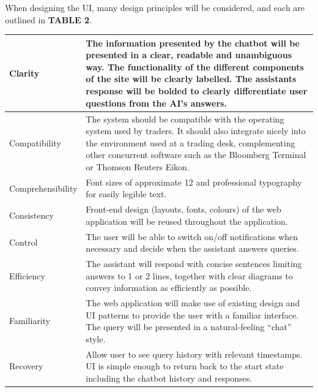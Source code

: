 \documentclass[]{IEEEtran}
\begin{document}
When designing the UI, many design principles will be considered, and each are outlined in \textbf{TABLE 2}.
	\begin{table}[h]
	\begin{tabular}{| m{2cm} | m{5.5cm} | }
		\hline
		Clarity & The information presented by the chatbot will be presented in a clear, readable and unambiguous way. The functionality of the different components of the site will be clearly labelled. The assistants response will be bolded to clearly differentiate user questions from the AI’s answers. \\
		
		\hline
		
		Compatibility & The system should be compatible with the operating system used by traders. It should also integrate nicely into the environment used at a trading desk, complementing other concurrent software such as the Bloomberg Terminal or Thomson Reuters Eikon. \\
		
		\hline
		
		Comprehensibility & Font sizes of approximate 12 and professional typography for easily legible text. \\
		
		\hline
		
		Consistency & Front-end design (layouts, fonts, colours) of the web application will be reused throughout the application. \\
		
		\hline
		
		Control & The user will be able to switch on/off notifications when necessary and decide when the assistant answers queries. \\
		
		\hline
		
		Efficiency & The assistant will respond with concise sentences limiting answers to 1 or 2 lines, together with clear diagrams to convey information as efficiently as possible. \\
		
		\hline
		
		Familiarity & The web application will make use of existing design and UI patterns to provide the user with a familiar interface. The query will be presented in a natural-feeling “chat” style. \\
		
		\hline 
		
		Recovery & Allow user to see query history with relevant timestamps. UI is simple enough to return back to the start state including the chatbot history and responses. \\
		

\end{tabular}
\end{table}
\end{document}
